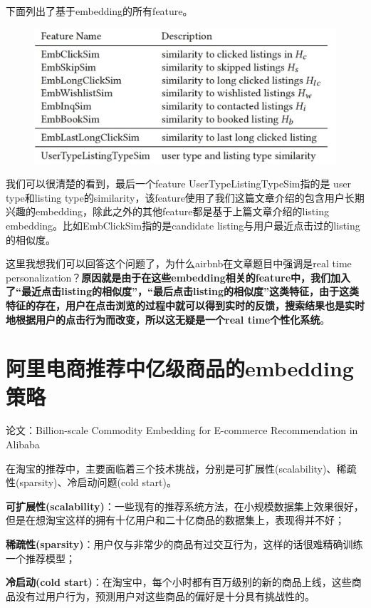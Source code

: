 \documentclass[12pt]{article}
\begin{document}
下面列出了基于embedding的所有feature。
\begin{figure}[H]
    \centering
    \includegraphics[width=1\textwidth]{fig/Airbnb_Embedding_Features.png}
\end{figure}

我们可以很清楚的看到，最后一个feature UserTypeListingTypeSim指的是 user type和listing type的similarity，该feature使用了我们这篇文章介绍的包含用户长期兴趣的embedding，除此之外的其他feature都是基于上篇文章介绍的listing embedding。比如EmbClickSim指的是candidate listing与用户最近点击过的listing的相似度。

这里我想我们可以回答这个问题了，为什么airbnb在文章题目中强调是real time personalization？\textbf{原因就是由于在这些embedding相关的feature中，我们加入了“最近点击listing的相似度”，“最后点击listing的相似度”这类特征，由于这类特征的存在，用户在点击浏览的过程中就可以得到实时的反馈，搜索结果也是实时地根据用户的点击行为而改变，所以这无疑是一个real time个性化系统}。

\section{阿里电商推荐中亿级商品的embedding策略\cite{Recommender_System_With_Deep_Learning_Ali_Embedding}}
论文：Billion-scale Commodity Embedding for E-commerce Recommendation in Alibaba

在淘宝的推荐中，主要面临着三个技术挑战，分别是可扩展性(scalability)、稀疏性(sparsity)、冷启动问题(cold start)。

\textbf{可扩展性(scalability)}：一些现有的推荐系统方法，在小规模数据集上效果很好，但是在想淘宝这样的拥有十亿用户和二十亿商品的数据集上，表现得并不好；

\textbf{稀疏性(sparsity)}：用户仅与非常少的商品有过交互行为，这样的话很难精确训练一个推荐模型；

\textbf{冷启动(cold start)}：在淘宝中，每个小时都有百万级别的新的商品上线，这些商品没有过用户行为，预测用户对这些商品的偏好是十分具有挑战性的。
\end{document}
